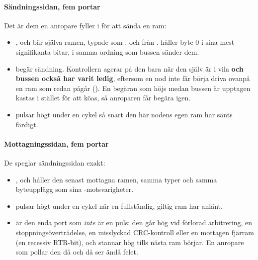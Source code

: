 \paragraph{Sändningssidan, fem portar}
Det är dem en anropare fyller i för att sända en ram:
\begin{itemize}
  \item {},  och  bär själva ramen, typade som ,
     och  från .  håller byte 0 i sina mest
    signifikanta bitar, i samma ordning som bussen sänder dem.
  \item {} begär sändning. Kontrollern agerar på den bara när den själv är i vila
    \textbf{och bussen också har varit ledig}, eftersom en nod inte får börja driva ovanpå en ram som
    redan pågår (). En begäran som höjs medan bussen är upptagen kastas i stället för
    att köas, så anroparen får begära igen.
  \item {} pulsar högt under en cykel så snart den här nodens egen ram har sänts färdigt.
\end{itemize}

\paragraph{Mottagningssidan, fem portar}
De speglar sändningssidan exakt:
\begin{itemize}
  \item {},  och  håller den senast mottagna ramen, samma typer
    och samma byteupplägg som sina -motsvarigheter.
  \item {} pulsar högt under en cykel när en fullständig, giltig ram har anlänt.
  \item {} är den enda port som \emph{inte} är en puls: den går hög vid förlorad
    arbitrering, en stoppningsöverträdelse, en misslyckad CRC-kontroll eller en mottagen fjärram (en
    recessiv RTR-bit), och stannar hög tills nästa ram börjar. En anropare som pollar den då och då
    ser ändå felet.
\end{itemize}

